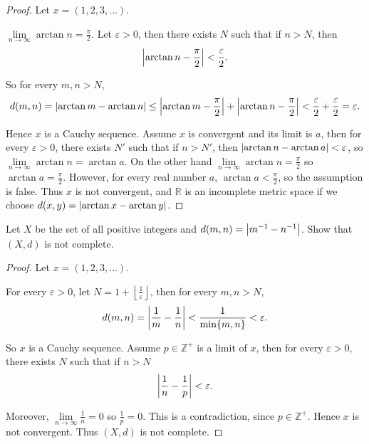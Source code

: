\begin{proof}
    Let $x = (1, 2, 3, \ldots)$.

    $\lim\limits_{n\to\infty}\arctan n = \frac{\pi}{2}$. Let $\varepsilon > 0$, then there exists $N$ such that if $n > N$, then
    \[
        \left\vert{\arctan n - \frac{\pi}{2}}\right\vert < \frac{\varepsilon}{2}.
    \]

    So for every $m, n > N$,
    \[
        d(m, n) = \left\vert{\arctan m - \arctan n}\right\vert \leq \left\vert{\arctan m - \frac{\pi}{2}}\right\vert + \left\vert{\arctan n - \frac{\pi}{2}}\right\vert < \frac{\varepsilon}{2} + \frac{\varepsilon}{2} = \varepsilon.
    \]

    Hence $x$ is a Cauchy sequence. Assume $x$ is convergent and its limit is $a$, then for every $\varepsilon > 0$, there exists $N'$ such that if $n > N'$, then $\left\vert{\arctan n - \arctan a}\right\vert < \varepsilon$, so $\lim\limits_{n\to\infty}\arctan n = \arctan a$. On the other hand $\lim\limits_{n\to\infty}\arctan n = \frac{\pi}{2}$ so $\arctan a = \frac{\pi}{2}$. However, for every real number $a$, $\arctan a < \frac{\pi}{2}$, so the assumption is false. Thus $x$ is not convergent, and $\mathbb{R}$ is an incomplete metric space if we choose $d(x, y) = \left\vert{\arctan x - \arctan y}\right\vert$.
\end{proof}


\begin{exercise}\label{chapter1:section5:exercise7}
    Let $X$ be the set of all positive integers and $d(m, n) = \left\vert{m^{-1} - n^{-1}}\right\vert$. Show that $(X, d)$ is not complete.
\end{exercise}

\begin{proof}
    Let $x = (1, 2, 3, \ldots)$.

    For every $\varepsilon > 0$, let $N = 1 + \left\lfloor\frac{1}{\varepsilon}\right\rfloor$, then for every $m, n > N$,
    \[
        d(m, n) = \left\vert{\frac{1}{m} - \frac{1}{n}}\right\vert < \frac{1}{\min\{m,n\}} < \varepsilon.
    \]

    So $x$ is a Cauchy sequence. Assume $p\in\mathbb{Z}^{+}$ is a limit of $x$, then for every $\varepsilon > 0$, there exists $N$ such that if $n > N$
    \[
        \left\vert{\frac{1}{n} - \frac{1}{p}}\right\vert < \varepsilon.
    \]

    Moreover, $\lim\limits_{n\to\infty}\frac{1}{n} = 0$ so $\frac{1}{p} = 0$. This is a contradiction, since $p\in\mathbb{Z}^{+}$. Hence $x$ is not convergent. Thus $(X, d)$ is not complete.
\end{proof}


